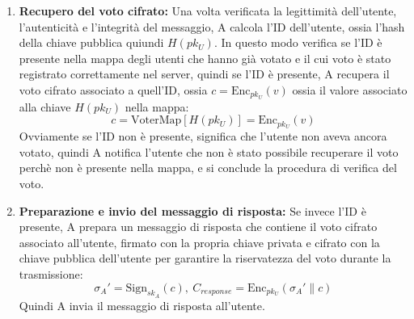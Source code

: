\begin{enumerate}
	\item \textbf{Recupero del voto cifrato:}
	Una volta verificata la legittimità dell'utente, l'autenticità e l'integrità del messaggio, A calcola l'ID dell'utente, ossia l'hash della chiave pubblica quiundi $H(pk_U)$. In questo modo verifica se l'ID è presente nella mappa degli utenti che hanno già votato e il cui voto è stato registrato correttamente nel server, quindi se l'ID è presente, A recupera il voto cifrato associato a quell'ID, ossia $c=\text{Enc}_{pk_U}(v)$ ossia il valore associato alla chiave $H(pk_U)$ nella mappa:
	$$ c = \text{VoterMap}[H(pk_U)] = \text{Enc}_{pk_U}(v) $$
	Ovviamente se l'ID non è presente, significa che l'utente non aveva ancora votato, quindi A notifica l'utente che non è stato possibile recuperare il voto perchè non è presente nella mappa, e si conclude la procedura di verifica del voto.

	\item \textbf{Preparazione e invio del messaggio di risposta:}
	Se invece l'ID è presente, A prepara un messaggio di risposta che contiene il voto cifrato associato all'utente, firmato con la propria chiave privata e cifrato con la chiave pubblica dell'utente per garantire la riservatezza del voto durante la trasmissione:
	$$ \sigma_A' = \text{Sign}_{sk_A}(c),\ C_{response} = \text{Enc}_{pk_U}(\sigma_A' \| c) $$
	Quindi A invia il messaggio di risposta all'utente.
\end{enumerate}

